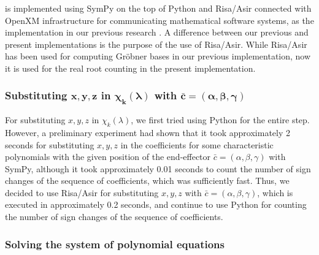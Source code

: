 \documentclass{birkjour}
\theoremstyle{plain}
\theoremstyle{definition}
\begin{document}
     is implemented using SymPy on the top of Python and Risa/Asir
    connected with OpenXM infrastructure for communicating mathematical software systems, 
    as the implementation in our previous research \cite{hor-ter-mik2020}.
    A difference between our previous and present implementations is the purpose of 
    the use of Risa/Asir. While Risa/Asir has been used for computing Gr\"obner bases
    in our previous implementation, now it is used for the real root counting in the 
    present implementation.
    
    \subsubsection{Substituting $\bm{x,y,z}$ in
     $\bm{\chi_k(\lambda)}$ with $\bm{\bar{c}=(\alpha,\beta,\gamma)}$}

    For substituting $x,y,z$ in $\chi_k(\lambda)$,
    we first tried using Python for the entire step.
    However, a preliminary experiment had shown that it took 
    approximately 2 seconds for substituting $x,y,z$ in the coefficients for some 
    characteristic polynomials with the given position of 
    the end-effector $\bar{c}=(\alpha,\beta,\gamma)$ with SymPy, although 
    it took approximately 0.01 seconds to count 
    the number of sign changes of the sequence of coefficients, which was  
    sufficiently fast. Thus, we decided to use Risa/Asir for substituting $x,y,z$ 
    with $\bar{c}=(\alpha,\beta,\gamma)$, which is executed in approximately 
    0.2 seconds, and continue to use Python for counting 
    the number of sign changes of the sequence of coefficients.

    \subsubsection{Solving the system of polynomial equations}
    \label{sec:solvesystem}
    
\end{document}
